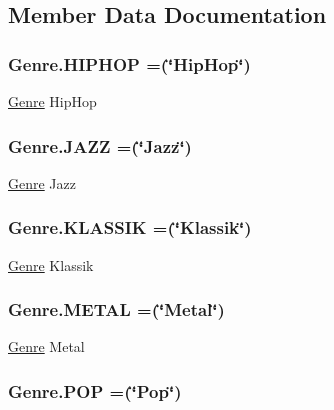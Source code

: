 \subsection{Member Data Documentation}
\hypertarget{enumGenre_a920a44dbb49797e79965fddc177c36d5}{
\subsubsection[{H\-I\-P\-H\-O\-P}]{\setlength{\rightskip}{0pt plus 5cm}Genre.\-H\-I\-P\-H\-O\-P =(\char`\"{}Hip\-Hop\char`\"{})}}\label{enumGenre_a920a44dbb49797e79965fddc177c36d5}
\hyperlink{enumGenre}{Genre} Hip\-Hop \hypertarget{enumGenre_a987305efa37d1df58608a8635407add0}{
\subsubsection[{J\-A\-Z\-Z}]{\setlength{\rightskip}{0pt plus 5cm}Genre.\-J\-A\-Z\-Z =(\char`\"{}Jazz\char`\"{})}}\label{enumGenre_a987305efa37d1df58608a8635407add0}
\hyperlink{enumGenre}{Genre} Jazz \hypertarget{enumGenre_a78a8368dbd53da52a36348fe432eda31}{
\subsubsection[{K\-L\-A\-S\-S\-I\-K}]{\setlength{\rightskip}{0pt plus 5cm}Genre.\-K\-L\-A\-S\-S\-I\-K =(\char`\"{}Klassik\char`\"{})}}\label{enumGenre_a78a8368dbd53da52a36348fe432eda31}
\hyperlink{enumGenre}{Genre} Klassik \hypertarget{enumGenre_a45892876ee0f75ebe59202cf7d57fc78}{
\subsubsection[{M\-E\-T\-A\-L}]{\setlength{\rightskip}{0pt plus 5cm}Genre.\-M\-E\-T\-A\-L =(\char`\"{}Metal\char`\"{})}}\label{enumGenre_a45892876ee0f75ebe59202cf7d57fc78}
\hyperlink{enumGenre}{Genre} Metal \hypertarget{enumGenre_a68166334621841bdb574dc1fbe97f0b8}{
\subsubsection[{P\-O\-P}]{\setlength{\rightskip}{0pt plus 5cm}Genre.\-P\-O\-P =(\char`\"{}Pop\char`\"{})}}\label{enumGenre_a68166334621841bdb574dc1fbe97f0b8}
